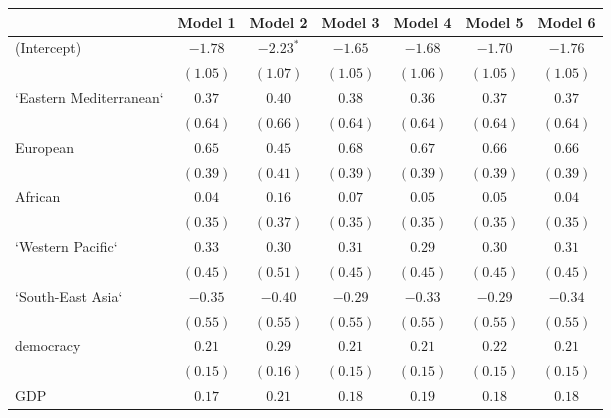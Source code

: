 
\begin{table}[!h]
\begin{center}
\begin{tabular}{l c c c c c c }
\toprule
 & Model 1 & Model 2 & Model 3 & Model 4 & Model 5 & Model 6 \\
\midrule
(Intercept)             & $-1.78$      & $-2.23^{*}$  & $-1.65$      & $-1.68$      & $-1.70$      & $-1.76$      \\
                        & $(1.05)$     & $(1.07)$     & $(1.05)$     & $(1.06)$     & $(1.05)$     & $(1.05)$     \\
`Eastern Mediterranean` & $0.37$       & $0.40$       & $0.38$       & $0.36$       & $0.37$       & $0.37$       \\
                        & $(0.64)$     & $(0.66)$     & $(0.64)$     & $(0.64)$     & $(0.64)$     & $(0.64)$     \\
European                & $0.65$       & $0.45$       & $0.68$       & $0.67$       & $0.66$       & $0.66$       \\
                        & $(0.39)$     & $(0.41)$     & $(0.39)$     & $(0.39)$     & $(0.39)$     & $(0.39)$     \\
African                 & $0.04$       & $0.16$       & $0.07$       & $0.05$       & $0.05$       & $0.04$       \\
                        & $(0.35)$     & $(0.37)$     & $(0.35)$     & $(0.35)$     & $(0.35)$     & $(0.35)$     \\
`Western Pacific`       & $0.33$       & $0.30$       & $0.31$       & $0.29$       & $0.30$       & $0.31$       \\
                        & $(0.45)$     & $(0.51)$     & $(0.45)$     & $(0.45)$     & $(0.45)$     & $(0.45)$     \\
`South-East Asia`       & $-0.35$      & $-0.40$      & $-0.29$      & $-0.33$      & $-0.29$      & $-0.34$      \\
                        & $(0.55)$     & $(0.55)$     & $(0.55)$     & $(0.55)$     & $(0.55)$     & $(0.55)$     \\
democracy               & $0.21$       & $0.29$       & $0.21$       & $0.21$       & $0.22$       & $0.21$       \\
                        & $(0.15)$     & $(0.16)$     & $(0.15)$     & $(0.15)$     & $(0.15)$     & $(0.15)$     \\
GDP                     & $0.17$       & $0.21$       & $0.18$       & $0.19$       & $0.18$       & $0.18$       \\

\end{tabular}
\end{center}
\end{table}
